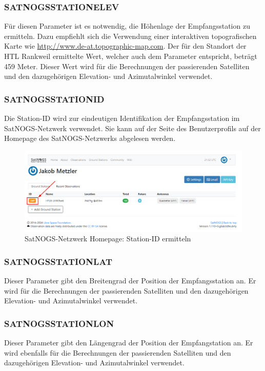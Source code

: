 \subsubsection{SATNOGS\textunderscore STATION\textunderscore ELEV}
Für diesen Parameter ist es notwendig, die Höhenlage der Empfangsstation zu ermitteln. Dazu empfiehlt sich die Verwendung einer interaktiven topografischen Karte wie \url{http://www.de-at.topographic-map.com}. Der für den Standort der HTL Rankweil ermittelte Wert, welcher auch dem Parameter entspricht, beträgt 459 Meter. Dieser Wert wird für die Berechnungen der passierenden Satelliten und den dazugehörigen Elevation- und Azimutalwinkel verwendet.

\subsubsection{SATNOGS\textunderscore STATION\textunderscore ID}
Die Station-ID wird zur eindeutigen Identifikation der Empfangsstation im SatNOGS-Netzwerk verwendet. Sie kann auf der Seite des Benutzerprofils auf der Homepage des SatNOGS-Netzwerks abgelesen werden. 

\begin{figure} [H]
	\centering
	\includegraphics[width=.75\linewidth]{../ref/stationid.png}
	\caption{SatNOGS-Netzwerk Homepage: Station-ID ermitteln \cite{noauthor_satnogsdashboard_nodate}}
	\label{fig:stationid}
\end{figure}

\subsubsection{SATNOGS\textunderscore STATION\textunderscore LAT}
Dieser Parameter gibt den Breitengrad der Position der Empfangsstation an. Er wird für die Berechnungen der passierenden Satelliten und den dazugehörigen Elevation- und Azimutalwinkel verwendet.

\subsubsection{SATNOGS\textunderscore STATION\textunderscore LON}
Dieser Parameter gibt den Längengrad der Position der Empfangstation an. Er wird ebenfalls für die Berechnungen der passierenden Satelliten und den dazugehörigen Elevation- und Azimutalwinkel verwendet.

